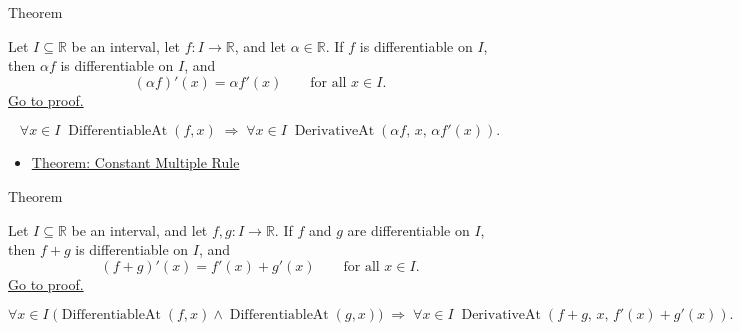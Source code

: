 
\begin{theorembox}{Theorem}
\begin{theorem}
\label{thm:constant-multiple-rule-interval}
Let $I \subseteq \mathbb{R}$ be an interval, let $f : I \to \mathbb{R}$, and let $\alpha \in \mathbb{R}$. If $f$ is differentiable on $I$, then $\alpha f$ is differentiable on $I$, and
\[
(\alpha f)'(x) = \alpha f'(x) \qquad \text{for all } x \in I.
\]
\hyperref[prf:constant-multiple-rule-interval]{Go to proof.}
\end{theorem}
\end{theorembox}

\begin{remark*}
\[
\forall x \in I\;\operatorname{DifferentiableAt}(f,x)
\;\Rightarrow\;
\forall x \in I\;\operatorname{DerivativeAt}(\alpha f,\,x,\,\alpha f'(x)).
\]
\end{remark*}

\begin{dependencies}
\begin{itemize}
  \item \hyperref[thm:constant-multiple-rule]{Theorem: Constant Multiple Rule}
\end{itemize}
\end{dependencies}


\begin{theorembox}{Theorem}
\begin{theorem}
\label{thm:sum-rule-interval}
Let $I \subseteq \mathbb{R}$ be an interval, and let $f, g : I \to \mathbb{R}$. If $f$ and $g$ are differentiable on $I$, then $f + g$ is differentiable on $I$, and
\[
(f+g)'(x) = f'(x) + g'(x) \qquad \text{for all } x \in I.
\]
\hyperref[prf:sum-rule-interval]{Go to proof.}
\end{theorem}
\end{theorembox}

\begin{remark*}
\[
\forall x \in I\;\bigl(\operatorname{DifferentiableAt}(f,x) \land \operatorname{DifferentiableAt}(g,x)\bigr)
\;\Rightarrow\;
\forall x \in I\;\operatorname{DerivativeAt}(f+g,\,x,\,f'(x)+g'(x)).
\]
\end{remark*}

